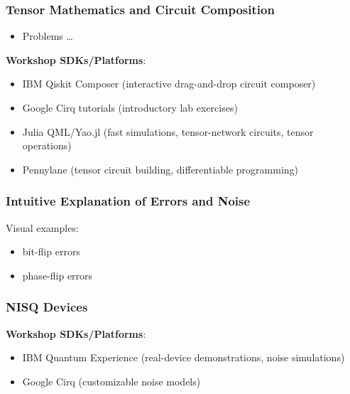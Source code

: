 \subsubsection{Tensor Mathematics and Circuit Composition}

\begin{itemize}
	\item Problems \ldots
\end{itemize}

\textbf{Workshop SDKs/Platforms}:

\begin{itemize}
	\item IBM Qiskit Composer (interactive drag-and-drop circuit composer)
	\item Google Cirq tutorials (introductory lab exercises)
	\item Julia QML/Yao.jl (fast simulations, tensor-network circuits, tensor operations)
	\item Pennylane (tensor circuit building, differentiable programming)
\end{itemize}


\subsubsection{Intuitive Explanation of Errors and Noise}

Visual examples:

\begin{itemize}
	\item bit-flip errors
	\item phase-flip errors
\end{itemize}


\subsubsection{NISQ Devices}

\textbf{Workshop SDKs/Platforms}:

\begin{itemize}
	\item IBM Quantum Experience (real-device demonstrations, noise simulations)
	\item Google Cirq (customizable noise models)
\end{itemize}


